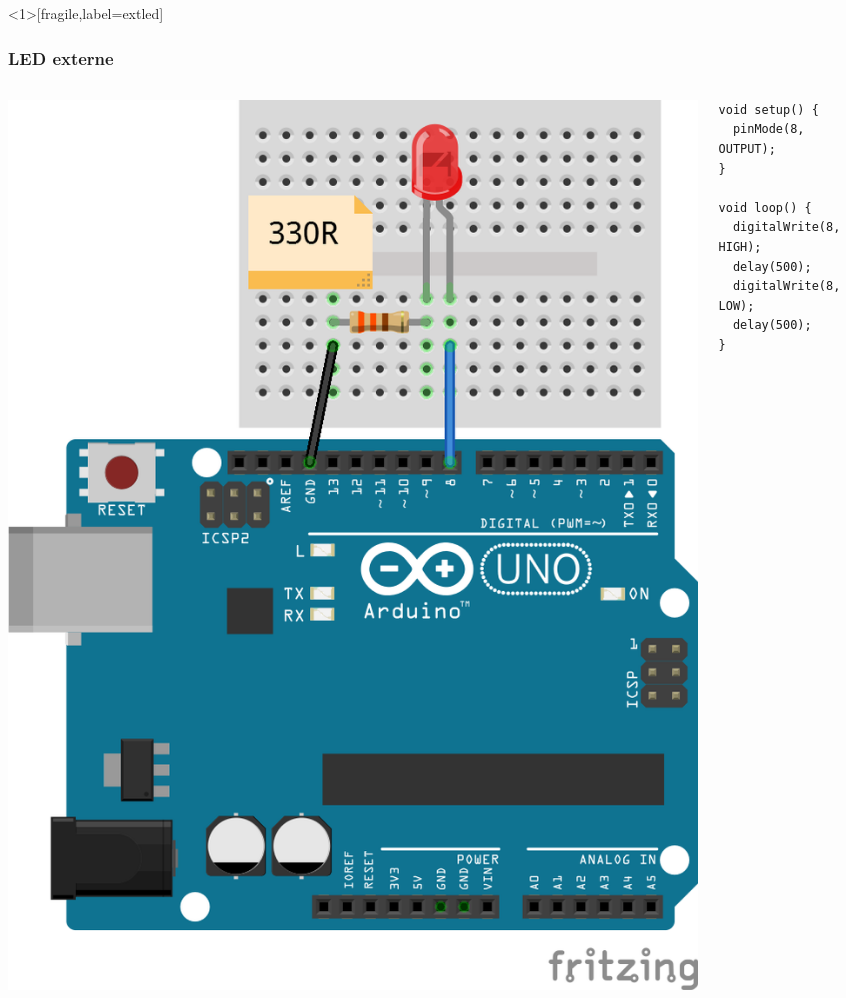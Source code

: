 \documentclass[aspectratio=169,utf8,french]{beamer}
\begin{document}
\begin{frame}<1>[fragile,label=extled]
  \frametitle{LED externe}
  \begin{columns}
    \begin{column}{.5\linewidth}
      \includegraphics[height=.8\textheight]{pictures/UNO-LED_bb.png}
    \end{column}
    \pause
    \begin{column}{.5\linewidth}
      \begin{lstlisting}
void setup() {
  pinMode(8, OUTPUT);
}

void loop() {
  digitalWrite(8, HIGH);
  delay(500);
  digitalWrite(8, LOW);
  delay(500);
}
      \end{lstlisting}
    \end{column}
  \end{columns}
\end{frame}
\end{document}
